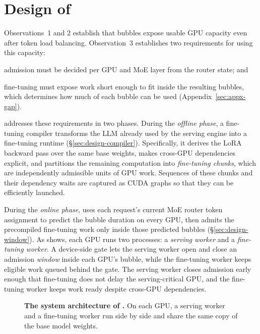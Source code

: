 \DeclareRobustCommand{\dstep}[1]{{\tikzexternaldisable\tikz[baseline=(s.base)]
  \node[circle, draw, inner sep=0.5pt, font=\tiny\bfseries] (s) {#1};}}

\section{Design of \sys{}}
\label{sec:design}

Observations~1 and 2 establish that bubbles expose usable GPU capacity even after token load balancing. Observation~3 establishes two requirements for using this capacity:
\begin{enumerate*}[label=(\roman*)]
    \item admission must be decided per GPU and \ac{MoE} layer from the router state; and
    \item fine-tuning must expose work short enough to fit inside the resulting bubbles, which determines how much of each bubble can be used (Appendix~\ref{sec:appx-gap}).
\end{enumerate*}

\sys{} addresses these requirements in two phases.
During the \emph{offline phase}, a fine-tuning compiler transforms the \ac{LLM} already used by the serving engine into a fine-tuning runtime (\S\ref{sec:design-compiler}).
Specifically, it derives the \ac{LoRA} backward pass over the same base weights, makes cross-GPU dependencies explicit, and partitions the remaining computation into \emph{fine-tuning chunks}, which are independently admissible units of GPU work. Sequences of these chunks and their dependency waits are captured as \textsc{CUDA} graphs so that they can be efficiently launched.

During the \emph{online phase}, \sys uses each request's current \ac{MoE} router token assignment to predict the bubble duration on every GPU, then admits the precompiled fine-tuning work only inside those predicted bubbles (\S\ref{sec:design-window}).
As  shows, each GPU runs two processes: a \emph{serving worker} and a \emph{fine-tuning worker}.
A device-side gate lets the serving worker open and close an admission \emph{window} inside each GPU's bubble, while the fine-tuning worker keeps eligible work queued behind the gate.
The serving worker closes admission early enough that fine-tuning does not delay the serving-critical GPU, and the fine-tuning worker keeps work ready despite cross-GPU dependencies.

\begin{figure}[t]
\centering
{}
\caption{\textbf{The system architecture of \sys.} On each GPU, a serving worker and a fine-tuning worker run side by side and share the same copy of the base model weights.}
\label{fig:design-overview}
\end{figure}

